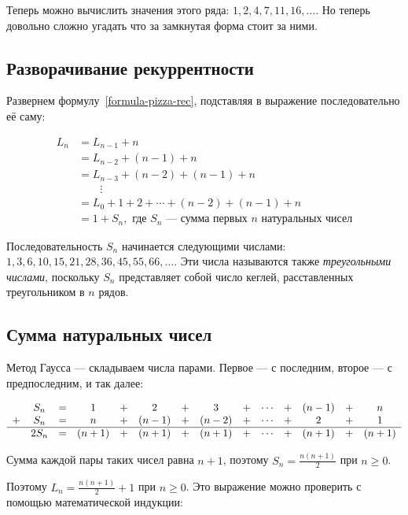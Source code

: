 \documentclass[14pt,openany]{book}
\begin{document}
Теперь можно вычислить значения этого ряда: $1, 2, 4, 7, 11, 16, \ldots$. 
Но теперь довольно сложно угадать что за замкнутая форма стоит за ними.

\subsection{Разворачивание рекуррентности}

Развернем формулу~\ref{formula-pizza-rec}, подставляя в выражение последовательно её саму:

\begin{align*}
L_n &= L_{n-1} + n \\
    &= L_{n-2} + (n-1) + n \\
    &= L_{n-3} + (n-2) + (n-1) + n \\
    & \qquad\vdots \\
    &= L_0 + 1 + 2 + \cdots + (n-2) + (n-1) + n \\
    &= 1 + S_n, \text{ где $S_n$ --- сумма первых $n$ натуральных чисел}
\end{align*}

Последовательность $S_n$ начинается следующими числами: $1, 3, 6, 10, 15, 21, 28, 36, 45, 55, 66, \ldots$.
Эти числа называются также \emph{треугольными числами}, поскольку $S_n$ представляет собой
число кеглей, расставленных треугольником в $n$ рядов.

\subsection{Сумма натуральных чисел}

Метод Гаусса --- складываем числа парами. Первое --- с последним, второе --- с предпоследним,
и так далее:

\begin{equation}
\begin{array}{cccccccccccccc}
  & S_n & = & 1 & + & 2 & + & 3 & + & \cdots & + & (n-1) & + & n \\
+ & S_n & = & n & + & (n-1) & + & (n-2) & + & \cdots & + & 2 & + & 1 \\
\hline
  & 2S_n & = & (n+1) & + & (n+1) & + & (n+1) & + & \cdots & + & (n+1) & + & (n+1)
\end{array}
\end{equation}

Сумма каждой пары таких чисел равна $n+1$, поэтому $S_n = \frac{n(n+1)}{2}$ при $n \ge 0$.

Поэтому $L_n = \frac{n(n+1)}{2} + 1$ при $n \ge 0$.
Это выражение можно проверить с помощью математической индукции:
\end{document}
